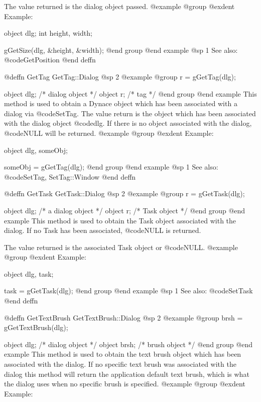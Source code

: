 The value returned is the dialog object passed.
@example
@group
@exdent Example:

object  dlg;
int     height, width;

gGetSize(dlg, &height, &width);
@end group
@end example
@sp 1
See also:  @code{GetPosition}
@end deffn




@deffn {GetTag} GetTag::Dialog
@sp 2
@example
@group
r = gGetTag(dlg);

object  dlg;   /*  dialog object  */
object  r;     /*  tag            */
@end group
@end example
This method is used to obtain a Dynace object which has been associated
with a dialog via @code{SetTag}.  The value return is the object which has
been associated with the dialog object @code{dlg}.  If there is no object
associated with the dialog, @code{NULL} will be returned.
@example
@group
@exdent Example:

object  dlg, someObj;

someObj = gGetTag(dlg);
@end group
@end example
@sp 1
See also:  @code{SetTag, SetTag::Window}
@end deffn










@deffn {GetTask} GetTask::Dialog
@sp 2
@example
@group
r = gGetTask(dlg);

object  dlg;   /*  a dialog object  */
object  r;     /*  Task object      */
@end group
@end example
This method is used to obtain the Task object associated with the dialog.
If no Task has been associated, @code{NULL} is returned.

The value returned is the associated Task object or @code{NULL}.
@example
@group
@exdent Example:

object  dlg, task;

task = gGetTask(dlg);
@end group
@end example
@sp 1
See also:  @code{SetTask}
@end deffn




@deffn {GetTextBrush} GetTextBrush::Dialog
@sp 2
@example
@group
brsh = gGetTextBrush(dlg);

object  dlg;    /*  dialog object  */
object  brsh;   /*  brush object   */
@end group
@end example
This method is used to obtain the text brush object which has been associated
with the dialog.  If no specific text brush was associated with the dialog
this method will return the application default text brush, which is what
the dialog uses when no specific brush is specified.
@example
@group
@exdent Example:

